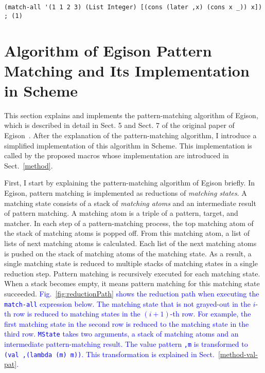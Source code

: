 \documentclass[acmlarge]{acmart}
\newcommand{\new}[1]{\textcolor{blue}{#1}}
\begin{document}
\begin{lstlisting}[language=egison]
(match-all '(1 1 2 3) (List Integer) [(cons (later ,x) (cons x _)) x]) ; (1)
\end{lstlisting}



\section{Algorithm of Egison Pattern Matching and Its Implementation in Scheme}\label{algorithm}

This section explains and implements the pattern-matching algorithm of Egison, which is described in detail in Sect. 5 and Sect. 7 of the original paper of Egison~\cite{egi2018aplas}.
After the explanation of the pattern-matching algorithm, I introduce a simplified implementation of this algorithm in Scheme.
This implementation is called by the proposed macros whose implementation are introduced in Sect.~\ref{method}.

\medskip

First, I start by explaining the pattern-matching algorithm of Egison briefly.
In Egison, pattern matching is implemented as reductions of \emph{matching states}.
A matching state consists of a stack of \emph{matching atoms} and an intermediate result of pattern matching.
A matching atom is a triple of a pattern, target, and matcher.
In each step of a pattern-matching process, the top matching atom of the stack of matching atoms is popped off.
From this matching atom, a list of lists of next matching atoms is calculated.
Each list of the next matching atoms is pushed on the stack of matching atoms of the matching state.
As a result, a single matching state is reduced to multiple stacks of matching states in a single reduction step.
Pattern matching is recursively executed for each matching state.
When a stack becomes empty, it means pattern matching for this matching state succeeded.
\new{
Fig.~\ref{fig:reductionPath} shows the reduction path when executing the \lstinline{match-all} expression below.
The matching state that is not grayed-out in the $i$-th row is reduced to matching states in the $(i+1)$-th row.
For example, the first matching state in the second row is reduced to the matching state in the third row.
\texttt{MState} takes two arguments, a stack of matching atoms and an intermediate pattern-matching result.
The value pattern \lstinline{,m} is transformed to \lstinline{(val ,(lambda (m) m))}.
This transformation is explained in Sect.~\ref{method-val-pat}.
}%
\end{document}
